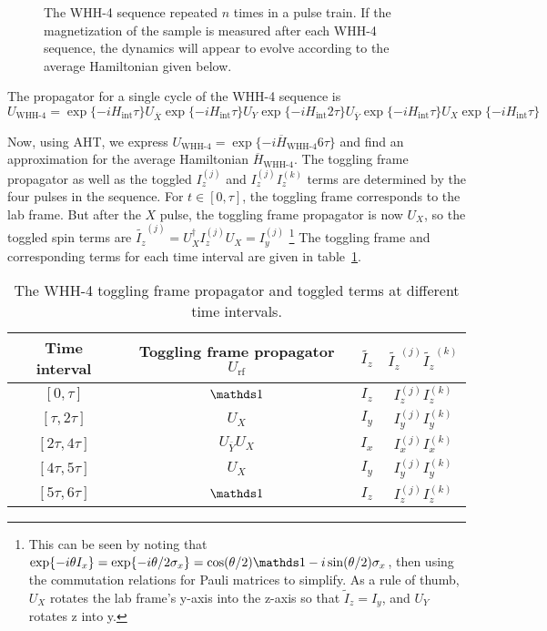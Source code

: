 \begin{figure}[H]
    \centering
    
    \caption{The WHH-4 sequence repeated $n$ times in a pulse train. If the magnetization of the sample is measured after each WHH-4 sequence, the dynamics will appear to evolve according to the average Hamiltonian given below.}
    \label{fig:WHH-4}
\end{figure}

The propagator for a single cycle of the WHH-4 sequence is
\begin{equation}
    U_{\text{WHH-4}} =
        \exp\{-i H_{\text{int}} \tau\} U_{\overline{X}}
        \exp\{-i H_{\text{int}} \tau\} U_Y
        \exp\{-i H_{\text{int}} 2\tau\} U_{\overline{Y}}
        \exp\{-i H_{\text{int}} \tau\} U_X
        \exp\{-i H_{\text{int}} \tau\}
\end{equation}

Now, using AHT, we express $U_{\text{WHH-4}} = \exp\{-i \overline{H}_{\text{WHH-4}} 6\tau\}$ and find an approximation for the average Hamiltonian $\overline{H}_{\text{WHH-4}}$. The toggling frame propagator as well as the toggled $I_z^{(j)}$ and $I_z^{(j)}I_z^{(k)}$ terms are determined by the four pulses in the sequence. For $t \in [0, \tau]$, the toggling frame corresponds to the lab frame.
But after the $X$ pulse, the toggling frame propagator is now $U_X$, so the toggled spin terms are $\widetilde{I_z}^{(j)} = U_X^\dagger I_z^{(j)} U_X = I_y^{(j)}$
\footnote{
This can be seen by noting that $\exp\{-i \theta I_x\} = \exp\{-i \theta/2 \sigma_x\} = \cos(\theta/2) \identity - i\sin(\theta/2) \sigma_x$, then using the commutation relations for Pauli matrices to simplify. As a rule of thumb, $U_X$ rotates the lab frame's y-axis into the z-axis so that $\widetilde{I}_z = I_y$, and $U_Y$ rotates z into y.
}
The toggling frame and corresponding terms for each time interval are given in table~\ref{tab:WHH-4}.

\begin{table}[H]
    \centering
    \caption{The WHH-4 toggling frame propagator and toggled terms at different time intervals.}
    \label{tab:WHH-4}
    \begin{tabular}{c c c c}
        Time interval & Toggling frame propagator $U_{\text{rf}}$ & $\widetilde{I_z}$ & $\widetilde{I_z}^{(j)}\widetilde{I_z}^{(k)}$ \\
        \hline
        $[0, \tau]$ & $\identity$ & $I_z$ & $I_z^{(j)}I_z^{(k)}$ \\
        $[\tau, 2\tau]$ & $U_X$ & $I_y$ & $I_y^{(j)}I_y^{(k)}$ \\
        $[2\tau, 4\tau]$ & $U_{\overline{Y}} U_X$ & $I_x$ & $I_x^{(j)}I_x^{(k)}$ \\
        $[4\tau, 5\tau]$ & $U_X$ & $I_y$ & $I_y^{(j)}I_y^{(k)}$ \\
        $[5\tau, 6\tau]$ & $\identity$ & $I_z$ & $I_z^{(j)}I_z^{(k)}$ \\
    \end{tabular}
\end{table}


